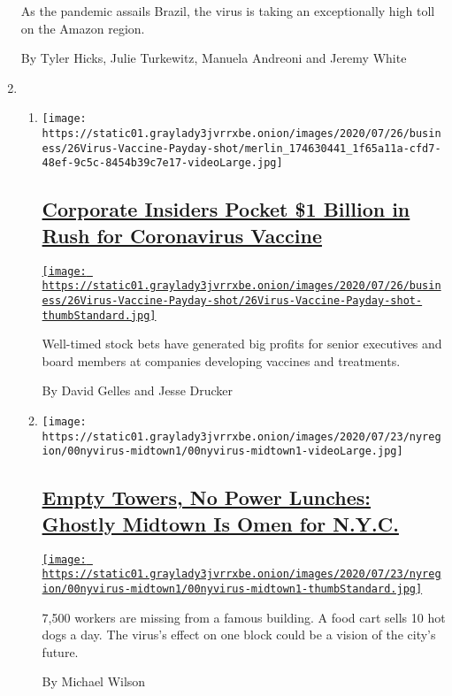\begin{enumerate}
  As the pandemic assails Brazil, the virus is taking an exceptionally
  high toll on the Amazon region.

  By Tyler Hicks, Julie Turkewitz, Manuela Andreoni and Jeremy White
\item
  \begin{enumerate}
  \def\labelenumii{\arabic{enumii}.}
  \item
    \texttt{[image: https://static01.graylady3jvrrxbe.onion/images/2020/07/26/business/26Virus-Vaccine-Payday-shot/merlin\_174630441\_1f65a11a-cfd7-48ef-9c5c-8454b39c7e17-videoLarge.jpg]}

    \hypertarget{corporate-insiders-pocket-1-billion-in-rush-for-coronavirus-vaccine}{%
    \subsection{\texorpdfstring{\href{/2020/07/25/business/coronavirus-vaccine-profits-vaxart.html}{Corporate
    Insiders Pocket \$1 Billion in Rush for Coronavirus
    Vaccine}}{Corporate Insiders Pocket \$1 Billion in Rush for Coronavirus Vaccine}}\label{corporate-insiders-pocket-1-billion-in-rush-for-coronavirus-vaccine}}

    \href{/2020/07/25/business/coronavirus-vaccine-profits-vaxart.html}{\texttt{[image: https://static01.graylady3jvrrxbe.onion/images/2020/07/26/business/26Virus-Vaccine-Payday-shot/26Virus-Vaccine-Payday-shot-thumbStandard.jpg]}}

    Well-timed stock bets have generated big profits for senior
    executives and board members at companies developing vaccines and
    treatments.

    By David Gelles and Jesse Drucker
  \item
    \texttt{[image: https://static01.graylady3jvrrxbe.onion/images/2020/07/23/nyregion/00nyvirus-midtown1/00nyvirus-midtown1-videoLarge.jpg]}

    \hypertarget{empty-towers-no-power-lunches-ghostly-midtown-is-omen-for-nyc}{%
    \subsection{\texorpdfstring{\href{/2020/07/26/nyregion/nyc-coronavirus-time-life-building.html}{Empty
    Towers, No Power Lunches: Ghostly Midtown Is Omen for
    N.Y.C.}}{Empty Towers, No Power Lunches: Ghostly Midtown Is Omen for N.Y.C.}}\label{empty-towers-no-power-lunches-ghostly-midtown-is-omen-for-nyc}}

    \href{/2020/07/26/nyregion/nyc-coronavirus-time-life-building.html}{\texttt{[image: https://static01.graylady3jvrrxbe.onion/images/2020/07/23/nyregion/00nyvirus-midtown1/00nyvirus-midtown1-thumbStandard.jpg]}}

    7,500 workers are missing from a famous building. A food cart sells
    10 hot dogs a day. The virus's effect on one block could be a vision
    of the city's future.

    By Michael Wilson
  \end{enumerate}
\end{enumerate}

